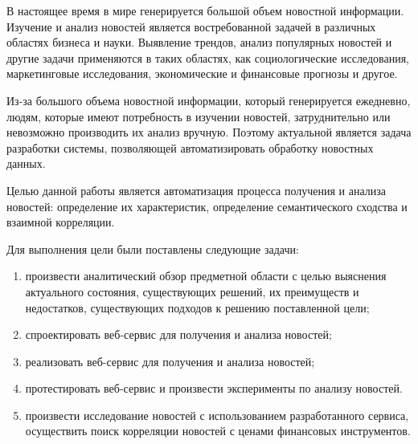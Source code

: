 \aftertitle

В настоящее время в мире генерируется большой объем новостной информации. Изучение и анализ новостей является востребованной задачей в различных областях бизнеса и науки. Выявление трендов, анализ популярных новостей и другие задачи применяются в таких областях, как социологические исследования, маркетинговые исследования, экономические и финансовые прогнозы и другое.

Из-за большого объема новостной информации, который генерируется ежедневно, людям, которые имеют потребность в изучении новостей, затруднительно или невозможно производить их анализ вручную. Поэтому актуальной является задача разработки системы, позволяющей автоматизировать обработку новостных данных.

Целью данной работы является автоматизация процесса получения и анализа новостей: определение их характеристик, определение семантического сходства и взаимной корреляции.

Для выполнения цели были поставлены следующие задачи:
\begin{enumerate}
    \item произвести аналитический обзор предметной области с целью выяснения актуального состояния, существующих решений, их преимуществ и недостатков, существующих подходов к решению поставленной цели;
    \item спроектировать веб-сервис для получения и анализа новостей;
    \item реализовать веб-сервис для получения и анализа новостей;
    \item протестировать веб-сервис и произвести эксперименты по анализу новостей.
    \item произвести исследование новостей с использованием разработанного сервиса, осуществить поиск корреляции новостей с ценами финансовых инструментов.
\end{enumerate}
